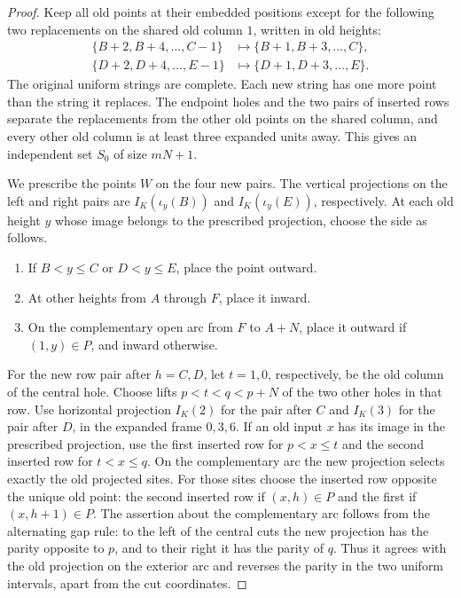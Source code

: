 \documentclass[11pt,colorlinks]{charlie}
\begin{document}
\begin{proof}
Keep all old points at their embedded positions except for the following two replacements on the shared old column $1$, written in old heights:
\begin{align*}
 \{B+2,B+4,\ldots,C-1\}&\longmapsto\{B+1,B+3,\ldots,C\},\\
 \{D+2,D+4,\ldots,E-1\}&\longmapsto\{D+1,D+3,\ldots,E\}.
\end{align*}
The original uniform strings are complete. Each new string has one more point than the string it replaces. The endpoint holes and the two pairs of inserted rows separate the replacements from the other old points on the shared column, and every other old column is at least three expanded units away. This gives an independent set $S_0$ of size $mN+1$.

We prescribe the points $W$ on the four new pairs. The vertical projections on the left and right pairs are $I_K(\iota_y(B))$ and $I_K(\iota_y(E))$, respectively. At each old height $y$ whose image belongs to the prescribed projection, choose the side as follows.
\begin{enumerate}
\item If $B<y\le C$ or $D<y\le E$, place the point outward.
\item At other heights from $A$ through $F$, place it inward.
\item On the complementary open arc from $F$ to $A+N$, place it outward if $(1,y)\in P$, and inward otherwise.
\end{enumerate}

For the new row pair after $h=C,D$, let $t=1,0$, respectively, be the old column of the central hole. Choose lifts $p<t<q<p+N$ of the two other holes in that row. Use horizontal projection $I_K(2)$ for the pair after $C$ and $I_K(3)$ for the pair after $D$, in the expanded frame $0,3,6$. If an old input $x$ has its image in the prescribed projection, use the first inserted row for $p<x\le t$ and the second inserted row for $t<x\le q$. On the complementary arc the new projection selects exactly the old projected sites. For those sites choose the inserted row opposite the unique old point: the second inserted row if $(x,h)\in P$ and the first if $(x,h+1)\in P$. The assertion about the complementary arc follows from the alternating gap rule: to the left of the central cuts the new projection has the parity opposite to $p$, and to their right it has the parity of $q$. Thus it agrees with the old projection on the exterior arc and reverses the parity in the two uniform intervals, apart from the cut coordinates.


\end{proof}
\end{document}
